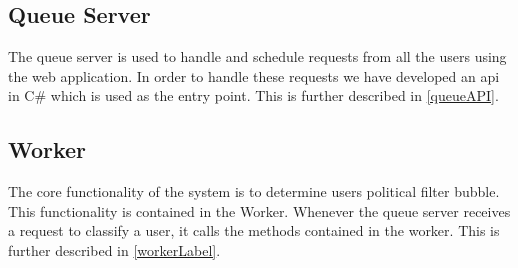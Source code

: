 \subsection{Queue Server}
The queue server is used to handle and schedule requests from all the users
using the web application. In order to handle these requests we have developed
an api in C\# which is used as the entry point. This is further described in
\autoref{queueAPI}. 

\subsection{Worker}
The core functionality of the system is to determine users political filter
bubble. This functionality is contained in the Worker. Whenever the queue server
receives a request to classify a user, it calls the methods contained in the
worker. This is further described in \autoref{workerLabel}.
